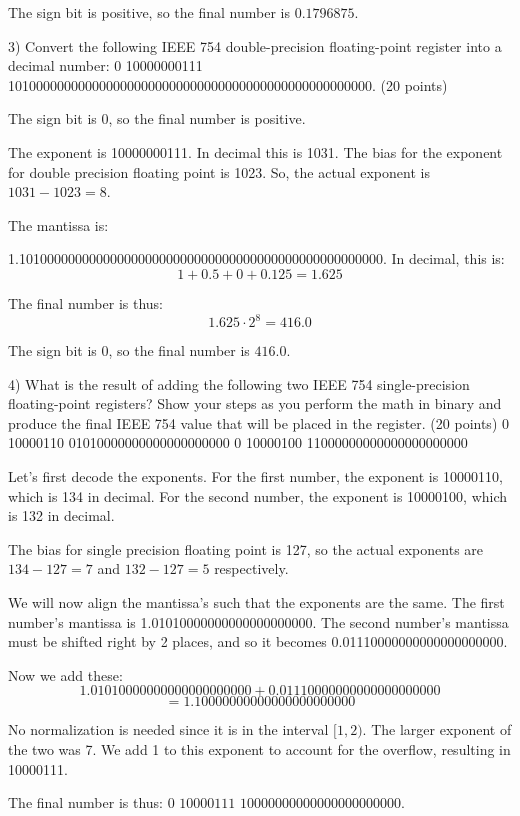 \documentclass{article}
\begin{document}
The sign bit is positive, so the final number is $0.1796875$.

\newpage

3) Convert the following IEEE 754 double-precision floating-point register into a decimal number: 0 10000000111 1010000000000000000000000000000000000000000000000000. (20 points)

The sign bit is 0, so the final number is positive.

The exponent is 10000000111. In decimal this is 1031.
The bias for the exponent for double precision floating point is 1023.
So, the actual exponent is $1031 - 1023 = 8$.

The mantissa is:

1.1010000000000000000000000000000000000000000000000000.
In decimal, this is:
\[1 + 0.5 + 0 + 0.125 = 1.625\]

The final number is thus:
\[1.625 \cdot 2^8 = 416.0\]

The sign bit is 0, so the final number is $416.0$.

\newpage

4) What is the result of adding the following two IEEE 754 single-precision floating-point registers? Show your steps as you perform the math in binary and produce the final IEEE 754 value that will be placed in the register. (20 points)
0 10000110 01010000000000000000000
0 10000100 11000000000000000000000

Let's first decode the exponents.
For the first number, the exponent is 10000110, which is 134 in decimal.
For the second number, the exponent is 10000100, which is 132 in decimal.

The bias for single precision floating point is 127, so the actual exponents
are $134 - 127 = 7$ and $132 - 127 = 5$ respectively.

We will now align the mantissa's such that the exponents are the same.
The first number's mantissa is 1.01010000000000000000000.
The second number's mantissa must be shifted right by 2 places, and so it becomes
0.01110000000000000000000.

Now we add these:
\[1.01010000000000000000000 + 0.01110000000000000000000\]
\[= 1.10000000000000000000000\]

No normalization is needed since it is in the interval $[1, 2)$.
The larger exponent of the two was 7. We add 1 to this exponent to account
for the overflow, resulting in 10000111.

The final number is thus:
$0$ $10000111$ $10000000000000000000000$.
\end{document}
